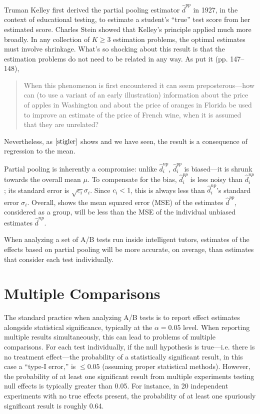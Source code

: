 \documentclass{edm_template}
\newcommand{\tauhat}{\hat{d}^{np}}
\newcommand{\shrink}{\hat{d}^{pp}}
\begin{document}
Truman Kelley \cite{kelley} first derived the partial pooling estimator $\shrink$ in 1927, in the context of educational testing, to estimate a student's ``true'' test score from her estimated score.
Charles Stein \cite{stein} showed that Kelley's principle applied much more broadly.
In any collection of $K\ge 3$ estimation problems, the optimal estimates must involve shrinkage.
What's so shocking about this result is that the estimation problems do not need to be related in any way. 
As \cite{stigler} put it (pp. 147--148), 
\begin{quote}
 When this phenomenon is first encountered it can
 seem preposterous---how can (to use a variant of an
 early illustration) information about the price of apples in Washington and about the price of oranges in
 Florida be used to improve an estimate of the price of
 French wine, when it is assumed that they are unrelated?
\end{quote} 
Nevertheless, as $\cite{stigler}$ shows and we have seen, the result is a consequence of regression to the mean. 

Partial pooling is inherently a compromise: unlike $\tauhat_i$, $\shrink_i$ is biased---it is shrunk towards the overall mean $\mu$.
To compensate for the bias, $\shrink_i$ is less noisy than $\tauhat_i$; its standard error is $\sqrt{c_i} \sigma_i$.
Since $c_i<1$, this is always less than $\tauhat_i$'s standard error $\sigma_i$. 
Overall, \cite{stein} shows the mean squared error (MSE) of the estimates $\shrink$, considered as a group, will be less than the MSE of the individual unbiased estimates $\tauhat$.

When analyzing a set of A/B tests run inside intelligent tutors, estimates of the effects based on partial pooling will be more accurate, on average, than estimates that consider each test individually.

\section{Multiple Comparisons}\label{sec:multipleComparisons}
The standard practice when analyzing A/B tests is to report effect estimates alongside statistical significance, typically at the $\alpha=0.05$ level.
When reporting multiple results simultaneously, this can lead to problems of multiple comparisons.
For each test individually, if the null hypothesis is true---i.e. there is no treatment effect---the probability of a statistically significant result, in this case a ``type-I error,'' is $\le 0.05$ (assuming proper statistical methods).
However, the probability of at least one significant result from multiple experiments testing null effects is typically greater than 0.05. 
For instance, in 20 independent experiments with no true effects present, the probability of at least one spuriously significant result is roughly 0.64. 
\end{document}
